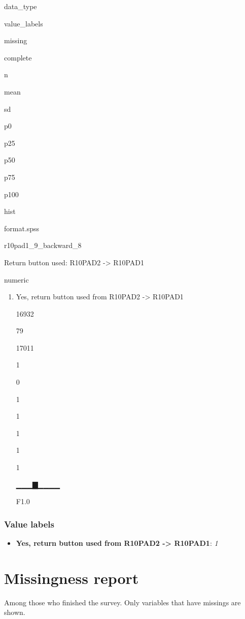 \documentclass[]{book}
\providecommand{\tightlist}{%
  \setlength{\itemsep}{0pt}\setlength{\parskip}{0pt}}
\begin{document}
data\_type

value\_labels

missing

complete

n

mean

sd

p0

p25

p50

p75

p100

hist

format.spss

r10pad1\_9\_backward\_8

Return button used: R10PAD2 -\textgreater{} R10PAD1

numeric

\begin{enumerate}
\def\labelenumi{\arabic{enumi}.}
\tightlist
\item
  Yes, return button used from R10PAD2 -\textgreater{} R10PAD1

  16932

  79

  17011

  1

  0

  1

  1

  1

  1

  1

  ▁▁▁▇▁▁▁▁

  F1.0
\end{enumerate}

\subsubsection{Value labels}\label{r10pad1_9_backward_8_labels}

\begin{itemize}
\tightlist
\item
  \textbf{Yes, return button used from R10PAD2 -\textgreater{} R10PAD1}:
  \emph{1}
\end{itemize}

\section{Missingness report}\label{missingness-report-1}

Among those who finished the survey. Only variables that have missings
are shown.
\end{document}
